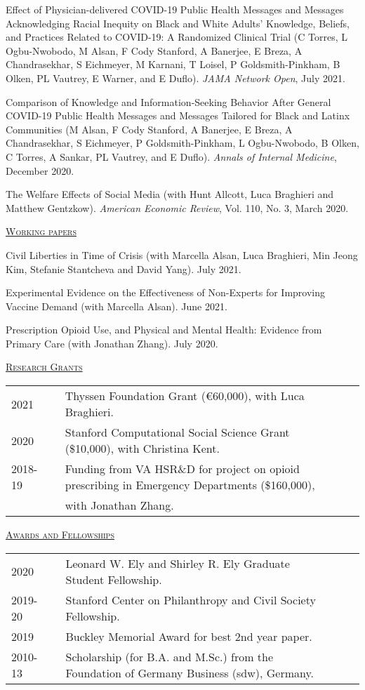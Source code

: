 \documentclass[letterpaper,11pt]{article}
\begin{document}
Effect of Physician-delivered COVID-19 Public Health Messages and Messages Acknowledging Racial Inequity on Black and White Adults' Knowledge, Beliefs, and Practices Related to COVID-19: A Randomized Clinical Trial (C Torres, L Ogbu-Nwobodo, M Alsan, F Cody Stanford, A Banerjee, E Breza, A Chandrasekhar, S Eichmeyer, M Karnani, T Loisel, P Goldsmith-Pinkham, B Olken, PL Vautrey, E Warner, and E Duflo). \textit{JAMA Network Open}, July 2021.

Comparison of Knowledge and Information-Seeking Behavior After General COVID-19 Public Health Messages and Messages Tailored for Black and Latinx Communities (M Alsan, F Cody Stanford, A Banerjee, E Breza, A Chandrasekhar, S Eichmeyer, P Goldsmith-Pinkham, L Ogbu-Nwobodo, B Olken, C Torres, A Sankar, PL Vautrey, and E Duflo). \textit{Annals of Internal Medicine}, December 2020.
 
The Welfare Effects of Social Media (with Hunt Allcott, Luca Braghieri and Matthew Gentzkow). \textit{American Economic Review}, Vol. 110, No. 3, March 2020.

\bigskip

\underline {\textsc{Working papers}}

Civil Liberties in Time of Crisis (with Marcella Alsan, Luca Braghieri, Min Jeong Kim, Stefanie Stantcheva and David Yang). July 2021.

Experimental Evidence on the Effectiveness of Non-Experts for Improving Vaccine Demand (with Marcella Alsan). June 2021.

Prescription Opioid Use, and Physical and Mental Health: Evidence from Primary Care (with Jonathan Zhang). July 2020.

 
 \bigskip

\newpage

\underline {\textsc{Research Grants}}

\begin{tabular}{@{}l@{}cl@{}cl}
2021 & & Thyssen Foundation Grant (\euro{}60,000), with Luca Braghieri. \\
2020 & & Stanford Computational Social Science Grant (\$10,000), with Christina Kent. \\
2018-19 & & Funding from VA HSR\&D for project on opioid prescribing in Emergency Departments (\$160,000), \\ & & with Jonathan Zhang.
\end{tabular}
 \bigskip
 
\underline {\textsc{Awards and Fellowships}}

\begin{tabular}{@{}l@{}cl@{}cl}
2020 & & Leonard W. Ely and Shirley R. Ely Graduate Student Fellowship. \\
2019-20 & & Stanford Center on Philanthropy and Civil Society Fellowship. \\
2019 & & Buckley Memorial Award for best 2nd year paper. \\
2010-13 & & Scholarship (for B.A. and M.Sc.) from the Foundation of Germany Business (sdw), Germany. \\

\end{tabular}
 \bigskip
 
\end{document}
